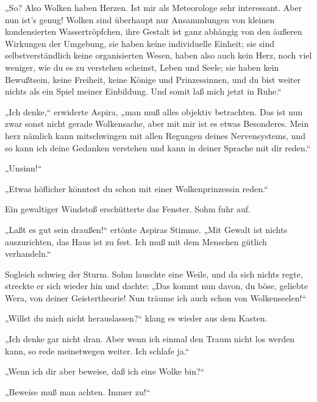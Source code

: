 „So? Also Wolken haben Herzen. Ist mir als Meteorologe sehr
interessant. Aber nun ist's genug! Wolken sind überhaupt nur
Ansammlungen von kleinen kondensierten Wassertröpfchen, ihre
Gestalt ist ganz abhängig von den äußeren Wirkungen der Umgebung,
sie haben keine individuelle Einheit; sie sind selbstverständlich
keine organisierten Wesen, haben also auch kein Herz, noch viel
weniger, wie du es zu verstehen scheinst, Leben und Seele; sie
haben kein Bewußtsein, keine Freiheit, keine Könige und
Prinzessinnen, und du bist weiter nichts als ein Spiel meiner
Einbildung. Und somit laß mich jetzt in Ruhe.“

„Ich denke,“ erwiderte Aspira, „man muß alles objektiv betrachten.
Das ist nun zwar sonst nicht gerade Wolkensache, aber mit mir ist
es etwas Besonderes. Mein herz nämlich kann mitschwingen mit allen
Regungen deines Nervensystems, und so kann ich deine Gedanken
verstehen und kann in deiner Sprache mit dir reden.“

„Unsinn!“

„Etwas höflicher könntest du schon mit einer Wolkenprinzessin
reden.“

Ein gewaltiger Windstoß erschütterte das Fenster. Sohm fuhr auf.

„Laßt es gut sein draußen!“ ertönte Aspiras Stimme. „Mit Gewalt ist
nichts auszurichten, das Haus ist zu fest. Ich muß mit dem Menschen
gütlich verhandeln.“

Sogleich schwieg der Sturm. Sohm lauschte eine Weile, und da sich
nichts regte, streckte er sich wieder hin und dachte: „Das kommt
nun davon, du böse, geliebte Wera, von deiner Geistertheorie! Nun
träume ich auch schon von Wolkenseelen!“

„Willst du mich nicht herauslassen?“ klang es wieder aus dem
Kasten.

„Ich denke gar nicht dran. Aber wenn ich einmal den Traum nicht los
werden kann, so rede meinetwegen weiter. Ich schlafe ja.“

„Wenn ich dir aber beweise, daß ich eine Wolke bin?“

„Beweise muß man achten. Immer zu!“

